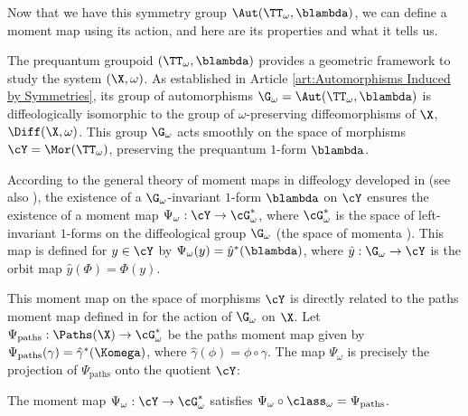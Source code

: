   \begin{article}
    \label{art:Momentum Map}
    
    Now that we have this symmetry group $\Aut(\TT_\omega, \blambda)$,
    we can define a moment map using its action,
    and here are its properties and what it tells us.
    
    The prequantum groupoid $(\TT_\omega, \blambda)$ provides a geometric framework to study the system $(\X, \omega)$.
    As established in Article \ref{art:Automorphisms Induced by Symmetries},
    its group of automorphisms $\G_\omega = \Aut(\TT_\omega, \blambda)$ is diffeologically isomorphic to the group of $\omega$-preserving diffeomorphisms of $\X$, $\Diff(\X, \omega)$.
    This group $\G_\omega$ acts smoothly on the space of morphisms $\cY = \Mor(\TT_\omega)$,
    preserving the prequantum $1$-form $\blambda$.
    
    According to the general theory of moment maps in diffeology developed in \cite{PIZ10} (see also \cite[Chap.\ 9]{PIZ13}),
    the existence of a $\G_\omega$-invariant $1$-form $\blambda$ on $\cY$ ensures the existence of a moment map $\Psi_\omega : \cY \to \cG_\omega^*$,
    where $\cG_\omega^*$ is the space of left-invariant $1$-forms on the diffeological group $\G_\omega$ (the space of momenta \cite[Art.~2.6]{PIZ10}).
    This map is defined for $y \in \cY$ by $\Psi_\omega(y) = \hat y^*(\blambda)$,
    where $\hat y : \G_\omega \to \cY$ is the orbit map $\hat y(\Phi) = \Phi(y)$.
    
    This moment map on the space of morphisms $\cY$ is directly related to the paths moment map defined in \cite[Art.~3.1]{PIZ10} for the action of $\G_\omega$ on $\X$.
    Let $\Psi_{\text{paths}} : \Paths(\X) \to \cG_\omega^*$ be the paths moment map given by $\Psi_{\text{paths}}(\gamma) = \hat\gamma^*(\Komega)$,
    where $\hat\gamma(\phi) = \phi \circ \gamma$.
    The map $\Psi_\omega$ is precisely the projection of $\Psi_{\text{paths}}$ onto the quotient $\cY$:
    
    \begin{proposition}{}
      The moment map $\Psi_\omega : \cY \to \cG_\omega^*$ satisfies $\Psi_\omega \circ \class_\omega = \Psi_{\text{paths}}$.
    \end{proposition}
    

\end{article}
